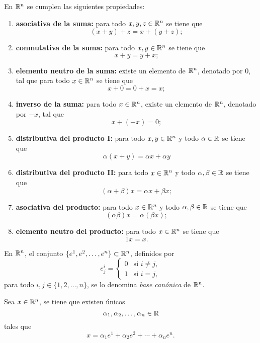 \documentclass[a4,11pt]{aleph-notas}
\begin{document}
\begin{teo}
    En $\mathbb{R}^n$ se cumplen las siguientes propiedades:
    \begin{enumerate}
    \item \textbf{asociativa de la suma:}
        para todo $x,y,z\in \mathbb{R}^n$ se tiene que
        \[
            (x + y) + z = x + (y + z);
        \]
    \item \textbf{conmutativa de la suma:}
        para todo $x,y\in \mathbb{R}^n$ se tiene que
        \[
            x + y = y + x;
        \]
    \item \textbf{elemento neutro de la suma:}
        existe un elemento de $\mathbb{R}^n$, denotado por $0$, tal que para todo $x\in \mathbb{R}^n$ se tiene que 
        \[
            x + 0 = 0 + x = x;
        \]
    \item \textbf{inverso de la suma:}
        para todo $x\in\mathbb{R}^n$, existe un elemento de $\mathbb{R}^n$, denotado por $-x$, tal que
        \[
            x + (-x)= 0;
        \]
    \item \textbf{distributiva del producto I:}
        para todo $x,y\in\mathbb{R}^n$ y todo $\alpha\in \mathbb{R}$ se tiene que
        \[
            \alpha (x + y)=\alpha x + \alpha y
        \]
    \item \textbf{distributiva del producto II:}
        para todo $x\in\mathbb{R}^n$ y todo $\alpha,\beta\in \mathbb{R}$ se tiene que
        \[
            (\alpha+\beta) x=\alpha x + \beta x;
        \]
    \item \textbf{asociativa del producto:}
        para todo $x\in\mathbb{R}^n$ y todo $\alpha,\beta\in \mathbb{R}$ se tiene que
        \[
            (\alpha\beta) x=\alpha(\beta x);
        \]
    \item \textbf{elemento neutro del producto:}
        para todo $x\in\mathbb{R}^n$ se tiene que
        \[
            1 x=x.
        \]
    \end{enumerate}
\end{teo}

\begin{defi}
    En $\mathbb{R}^n$, el conjunto $\{e^1,e^2,\ldots,e^n\}\subset\mathbb{R}^n$, definidos por 
    \[
        e^i_j=
        \begin{cases}
            0& \text{si }i\neq j,\\
            1& \text{si }i= j,
        \end{cases}
    \]
    para todo $i,j\in\{1,2,\ldots,n\}$, se lo denomina \emph{base canónica} de $\mathbb{R}^n$.
\end{defi}

\begin{teo}
    Sea $x\in\mathbb{R}^n$, se tiene que existen únicos
    \[
        \alpha_1,\alpha_2,\ldots,\alpha_n\in\mathbb{R}
    \]
    tales que
    \[
        x = \alpha_1e^1 + \alpha_2 e^2 + \cdots + \alpha_n e^n.
    \]
\end{teo}
\end{document}
